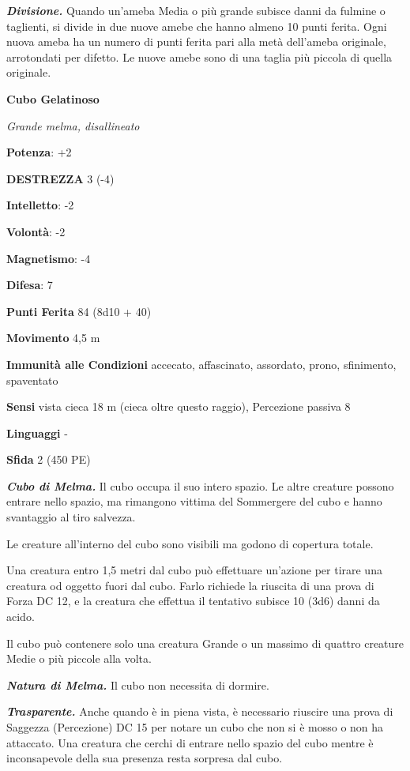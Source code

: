 \begin{multicols}{2}
\emph{\textbf{Divisione.}} Quando un'ameba Media o più grande subisce
danni da fulmine o taglienti, si divide in due nuove amebe che hanno
almeno 10 punti ferita. Ogni nuova ameba ha un numero di punti ferita
pari alla metà dell'ameba originale, arrotondati per difetto. Le nuove
amebe sono di una taglia più piccola di quella originale.

\textbf{Cubo Gelatinoso}

\emph{Grande melma, disallineato}

\textbf{Potenza}: +2

\textbf{DESTREZZA} 3 (-4)



\textbf{Intelletto}: -2

\textbf{Volontà}: -2

\textbf{Magnetismo}: -4

\textbf{Difesa}: 7

\textbf{Punti Ferita} 84 (8d10 + 40)

\textbf{Movimento} 4,5 m

\textbf{Immunità alle Condizioni} accecato, affascinato, assordato,
prono, sfinimento, spaventato

\textbf{Sensi} vista cieca 18 m (cieca oltre questo raggio), Percezione
passiva 8

\textbf{Linguaggi} -

\textbf{Sfida} 2 (450 PE)

\emph{\textbf{Cubo di Melma.}} Il cubo occupa il suo intero spazio. Le
altre creature possono entrare nello spazio, ma rimangono vittima del
Sommergere del cubo e hanno svantaggio al tiro salvezza.

Le creature all'interno del cubo sono visibili ma godono di copertura
totale.

Una creatura entro 1,5 metri dal cubo può effettuare un'azione per
tirare una creatura od oggetto fuori dal cubo. Farlo richiede la
riuscita di una prova di Forza DC 12, e la creatura che effettua il
tentativo subisce 10 (3d6) danni da acido.

Il cubo può contenere solo una creatura Grande o un massimo di quattro
creature Medie o più piccole alla volta.

\emph{\textbf{Natura di Melma.}} Il cubo non necessita di dormire.

\emph{\textbf{Trasparente.}} Anche quando è in piena vista, è necessario
riuscire una prova di Saggezza (Percezione) DC 15 per notare un cubo che
non si è mosso o non ha attaccato. Una creatura che cerchi di entrare
nello spazio del cubo mentre è inconsapevole della sua presenza resta
sorpresa dal cubo.


\end{multicols}
